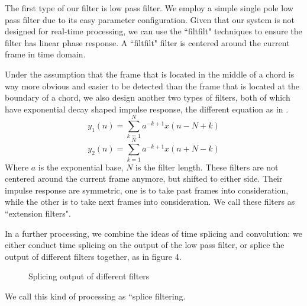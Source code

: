 \documentclass{article}
\begin{document}
The first type of our filter is low pass filter. We employ a simple single pole low pass filter due to its easy parameter configuration. Given that our system is not designed for real-time processing, we can use the ``filtfilt" techniques to ensure the filter has linear phase response. A ``filtfilt" filter is centered around the current frame in time domain. 

Under the assumption that the frame that is located in the middle of a chord is way more obvious and easier to be detected than the frame that is located at the boundary of a chord, we also design another two types of filters, both of which have exponential decay shaped impulse response, the different equation as in  . 
\begin{equation}\label{filter1}
y_{1}(n) = \sum_{k=1}^N a^{-k+1} x(n-N+k)
\end{equation}
\begin{equation}\label{filter2}
y_{2}(n) = \sum_{k=1}^N a^{-k+1} x(n+N-k)
\end{equation} 
Where $a$ is the exponential base, $N$ is the filter length. 
These filters are not centered around the current frame anymore, but shifted to either side. Their impulse response are symmetric, one is to take past frames into consideration, while the other is to take next frames into consideration. We call these filters as ``extension filters".  

In a further processing, we combine the ideas of time splicing and convolution: we either conduct time splicing on the output of the low pass filter, or splice the output of different filters together, as in figure 4.
\begin{figure}
 \centerline{}
 \caption{Splicing output of different filters}
\end{figure}
We call this kind of processing as ``splice filtering. 
 
\end{document}
